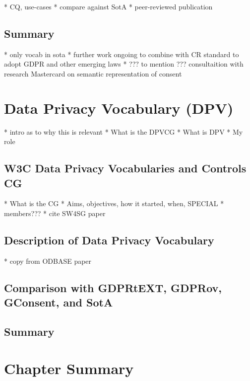 * CQ, use-cases
* compare against SotA
* peer-reviewed publication

\subsection*{Summary}

* only vocab in sota
* further work ongoing to combine with CR standard to adopt GDPR and other emerging laws
* ??? to mention ??? consultaition with research Mastercard on semantic representation of consent

\section{Data Privacy Vocabulary (DPV)}\label{sec:voc:DPV}

* intro as to why this is relevant
* What is the DPVCG
* What is DPV
* My role

\subsection{W3C Data Privacy Vocabularies and Controls CG}
* What is the CG
* Aims, objectives, how it started, when, SPECIAL
* members???
* cite SW4SG paper

\subsection{Description of Data Privacy Vocabulary}
* copy from ODBASE paper

\subsection{Comparison with GDPRtEXT, GDPRov, GConsent, and SotA}

\subsection*{Summary}

\section{Chapter Summary}